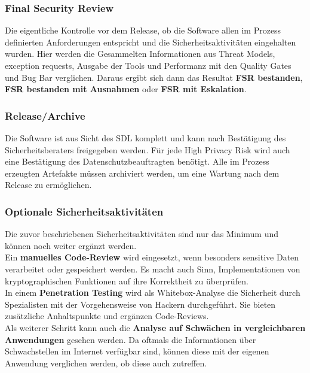 \subsubsection{Final Security Review}
Die eigentliche Kontrolle vor dem Release, ob die Software allen im Prozess definierten Anforderungen entspricht und die Sicherheitsaktivitäten eingehalten wurden. Hier werden die Gesammelten Informationen aus Threat Models, exception requests, Ausgabe der Tools und Performanz mit den Quality Gates und Bug Bar verglichen. Daraus ergibt sich dann das Resultat \textbf{FSR bestanden}, \textbf{FSR bestanden mit Ausnahmen} oder \textbf{FSR mit Eskalation}.

\subsubsection{Release/Archive}
Die Software ist aus Sicht des SDL komplett und kann nach Bestätigung des Sicherheitsberaters freigegeben werden. Für jede High Privacy Risk wird auch eine Bestätigung des Datenschutzbeauftragten benötigt.
Alle im Prozess erzeugten Artefakte müssen archiviert werden, um eine Wartung nach dem Release zu ermöglichen.

\subsubsection*{Optionale Sicherheitsaktivitäten}
Die zuvor beschriebenen Sicherheitsaktivitäten sind nur das Minimum und können noch weiter ergänzt werden.\\
Ein \textbf{manuelles Code-Review} wird eingesetzt, wenn besonders sensitive Daten verarbeitet oder gespeichert werden. Es macht auch Sinn, Implementationen von kryptographischen Funktionen auf ihre Korrektheit zu überprüfen.\\
In einem \textbf{Penetration Testing} wird als Whitebox-Analyse die Sicherheit durch Spezialisten mit der Vorgehensweise von Hackern durchgeführt. Sie bieten zusätzliche Anhaltspunkte und ergänzen Code-Reviews.\\
Als weiterer Schritt kann auch die \textbf{Analyse auf Schwächen in vergleichbaren Anwendungen} gesehen werden. Da oftmals die Informationen über Schwachstellen im Internet verfügbar sind, können diese mit der eigenen Anwendung verglichen werden, ob diese auch zutreffen.